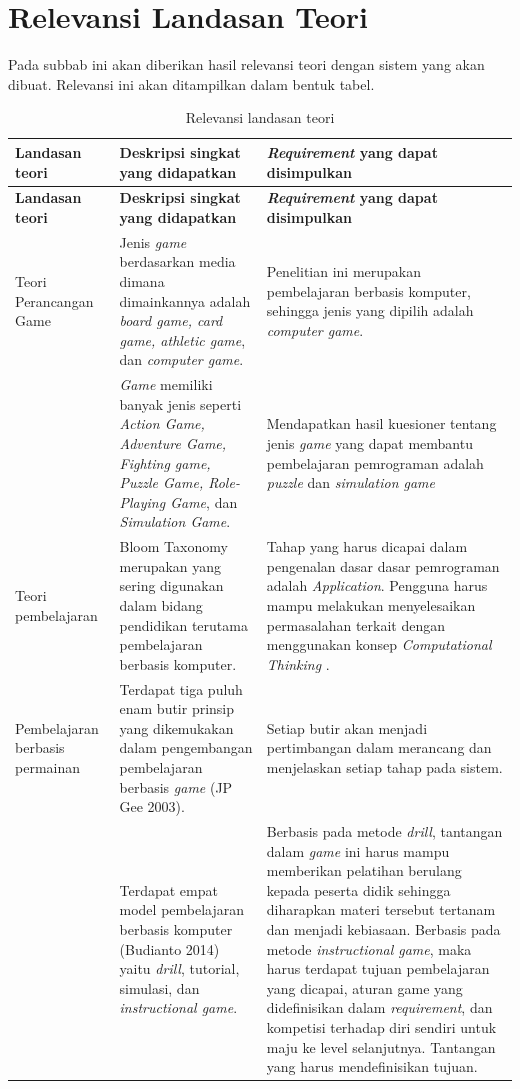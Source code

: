 \section{Relevansi Landasan Teori}
Pada subbab ini akan diberikan hasil relevansi teori dengan sistem yang akan dibuat. Relevansi ini akan ditampilkan dalam bentuk tabel.
\begin{longtable}{| p{2cm} | p{5cm} | p{5cm} |}
	\caption{Relevansi landasan teori} \\
	\hline
	\textbf{Landasan teori} & \textbf{Deskripsi singkat yang didapatkan} & \textbf{\textit{Requirement} yang dapat disimpulkan} \\
	\hline
	\endfirsthead
		\hline
		\textbf{Landasan teori} & \textbf{Deskripsi singkat yang didapatkan} & \textbf{\textit{Requirement} yang dapat disimpulkan} \\
		\hline
		\endhead
		Teori Perancangan Game & Jenis \textit{game} berdasarkan media dimana dimainkannya adalah \textit{board game, card game, athletic game}, dan \textit{computer game}. & Penelitian ini merupakan pembelajaran berbasis komputer, sehingga jenis yang dipilih adalah \textit{computer game}. \\
		\hline
		& \textit{Game} memiliki banyak jenis seperti \textit{Action Game, Adventure Game, Fighting game, Puzzle Game, Role-Playing Game}, dan \textit{Simulation Game}. & Mendapatkan hasil kuesioner tentang jenis \textit{game} yang dapat membantu pembelajaran pemrograman adalah \textit{puzzle} dan \textit{simulation game}\\
		\hline
		Teori pembelajaran & Bloom Taxonomy merupakan yang sering digunakan dalam bidang pendidikan terutama pembelajaran berbasis komputer. & Tahap yang harus dicapai dalam pengenalan dasar dasar pemrograman adalah \textit{Application}. Pengguna harus mampu melakukan menyelesaikan permasalahan terkait dengan menggunakan konsep \textit{Computational Thinking }. \\
		\hline
		Pembelajaran berbasis permainan & Terdapat tiga puluh enam butir prinsip yang dikemukakan dalam pengembangan pembelajaran berbasis \textit{game} (JP Gee 2003). & Setiap butir akan menjadi pertimbangan dalam merancang dan menjelaskan setiap tahap pada sistem. \\
		\hline
		& Terdapat empat model pembelajaran berbasis komputer (Budianto 2014) yaitu \textit{drill}, tutorial, simulasi, dan \textit{instructional game}. & Berbasis pada metode \textit{drill}, tantangan dalam  \textit{game} ini harus mampu memberikan pelatihan berulang kepada peserta didik sehingga diharapkan materi tersebut tertanam dan menjadi kebiasaan. Berbasis pada metode \textit{instructional game}, maka harus terdapat tujuan pembelajaran yang dicapai, aturan game yang didefinisikan dalam \textit{requirement}, dan kompetisi terhadap diri sendiri untuk maju ke level selanjutnya. Tantangan yang harus mendefinisikan tujuan. \\

\end{longtable}
